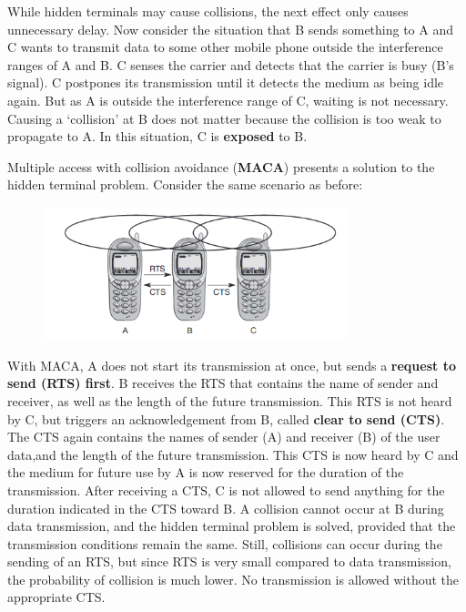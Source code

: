 \documentclass[12pt]{article}
\begin{document}
While hidden terminals may cause collisions, the next effect only
causes unnecessary delay. Now consider the situation that B sends something to
A and C wants to transmit data to some other mobile phone outside the
interference ranges of A and B. C senses the carrier and detects that the
carrier is busy (B's signal). C postpones its transmission until it detects the
medium as being idle again. But as A is outside the interference range of C,
waiting is not necessary. Causing a `collision' at B does not matter because the
collision is too weak to propagate to A. In this situation, C is
\textbf{exposed} to B.

Multiple access with collision avoidance (\textbf{MACA}) presents a solution to
the hidden terminal problem. Consider the same scenario as before:
\begin{figure}[H]
    \centering
    \includegraphics[width=250pt]{hidden_terminal_soln.png}
\end{figure}
With MACA, A does not start its transmission at once, but sends
a \textbf{request to send (RTS) first}. B receives the RTS that contains the
name of sender and receiver, as well as the length of the future transmission.
This RTS is not heard by C, but triggers an acknowledgement from B, called
\textbf{clear to send (CTS)}. The CTS again contains the names of sender (A)
and receiver (B) of the user data,and the length of the future transmission.
This CTS is now heard by C and the medium for future use by A is now reserved
for the duration of the transmission. After receiving a CTS, C is not allowed
to send anything for the duration indicated in the CTS toward B. A collision
cannot occur at B during data transmission, and the hidden terminal
problem is solved, provided that the transmission conditions remain the
same. Still, collisions can occur during the sending of an RTS, but since 
RTS is very small compared to data transmission, the probability of collision
is much lower. No transmission is allowed without the appropriate CTS.
\end{document}
